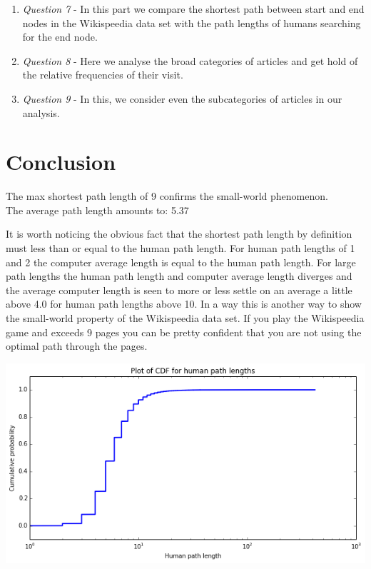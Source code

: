 \documentclass[11pt]{article}
\begin{document}
\begin{enumerate}
\item \textit{Question 7} - In this part we compare the shortest path between start and end nodes in the Wikispeedia data set with the path lengths of humans searching for the end node. 

\item \textit{Question 8} - Here we analyse the broad categories of articles and get hold of the relative frequencies of their visit.

\item \textit{Question 9} - In this, we consider even the subcategories of articles in our analysis.
\end{enumerate}

\section{Conclusion}
The max shortest path length of 9 confirms the small-world phenomenon.\\
The average path length amounts to: 5.37

\medskip

It is worth noticing the obvious fact that the shortest path length by definition must less than or equal to the human path length. For human path lengths of 1 and 2 the computer average length is equal to the human path length. For large path lengths the human path length and computer average length diverges and the average computer length is seen to more or less settle on an average a little above 4.0 for human path lengths above 10. In a way this is another way to show the small-world property of the Wikispeedia data set. If you play the Wikispeedia game and exceeds 9 pages you can be pretty confident that you are not using the optimal path through the pages.

\includegraphics[scale=0.5]{Unknown.png}
\end{document}
